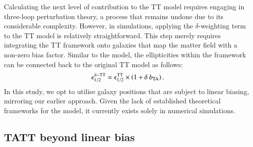 Calculating the next level of contribution to the TT model requires engaging in three-loop perturbation theory, a process that remains undone due to its considerable complexity.
However, in simulations, applying the $\delta$-weighting term to the TT model is relatively straightforward.
This step merely requires integrating the TT framework onto galaxies that map the matter field with a non-zero bias factor. 
Similar to the \dNLA model, the ellipticities within the \dTT framework can be connected back to the original TT model as follows:
\begin{eqnarray}
\epsilon_{1/2}^{\delta-\rm TT} = \epsilon_{1/2}^{\rm TT}\times(1 + \delta \: b_{\rm TA}) \, .
\label{eq:tidal_th_deltaTT}
\end{eqnarray}
In this study, we opt to utilise galaxy positions that are subject to linear biasing, mirroring our earlier approach.
Given the lack of established theoretical frameworks for the \dTT model, it currently exists solely in numerical simulations.

 
\subsection{TATT beyond linear bias}
\label{subsec:HOD-TATT}


